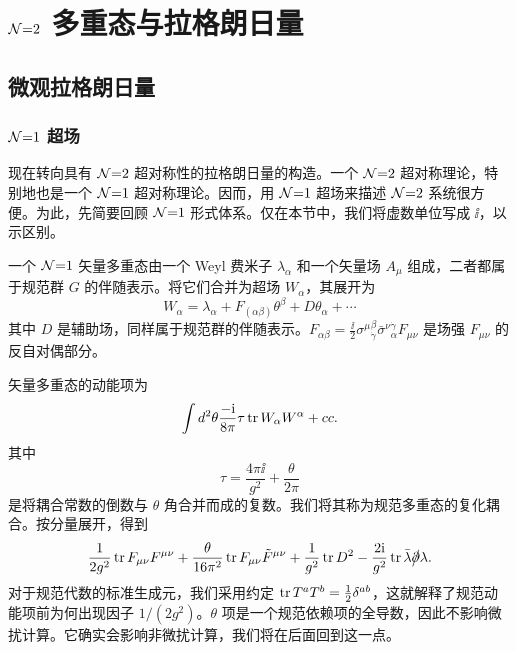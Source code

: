 \section{$\mathcal{N}{=}2$ 多重态与拉格朗日量}\label{sec:lagrangian}

\subsection{微观拉格朗日量}
\subsubsection{$\mathcal{N}{=}1$ 超场}
现在转向具有 $\mathcal{N}{=}2$ 超对称性的拉格朗日量的构造。一个 $\mathcal{N}{=}2$ 超对称理论，特别地也是一个 $\mathcal{N}{=}1$ 超对称理论。因而，用 $\mathcal{N}{=}1$ 超场来描述 $\mathcal{N}{=}2$ 系统很方便。为此，先简要回顾 $\mathcal{N}{=}1$ 形式体系。仅在本节中，我们将虚数单位写成 $\ii$，以示区别。

一个 $\mathcal{N}{=}1$ 矢量多重态由一个 Weyl 费米子 $\lambda_\alpha$ 和一个矢量场 $A_\mu$ 组成，二者都属于规范群 $G$ 的伴随表示。将它们合并为超场 $W_\alpha$，其展开为
\begin{equation}
W_\alpha=\lambda_\alpha+F_{(\alpha\beta)}\theta^\beta + D\theta_\alpha+\cdots
\end{equation}
其中 $D$ 是辅助场，同样属于规范群的伴随表示。$F_{\alpha\beta}=\frac \ii2 \sigma^\mu{}^\beta_{\dot\gamma} \bar\sigma^{\nu}{}^{\dot \gamma}_\alpha F_{\mu\nu}$ 是场强 $F_{\mu\nu}$ 的反自对偶部分。

矢量多重态的动能项为
\begin{equation}
\int d^2\theta \frac{-\mathrm{i}}{8\pi} \tau \mathop{\mathrm{tr}}\nolimits W_\alpha W^\alpha + cc.
\end{equation}
其中
\begin{equation}
\tau=\frac{4\pi \ii}{g^2}+\frac{\theta}{2\pi}
\end{equation}
是将耦合常数的倒数与 $\theta$ 角合并而成的复数。我们将其称为规范多重态的复化耦合。按分量展开，得到
\begin{equation}
\frac{1}{2g^2} \tr F_{\mu\nu}F^{\mu\nu} + \frac{\theta}{16\pi^2} \tr F_{\mu\nu} \tilde F^{\mu\nu} + \frac{1}{g^2}\tr D^2 -\frac{2\ii}{g^2}\tr \bar\lambda\slash\partial \lambda.
\end{equation}
对于规范代数的标准生成元，我们采用约定 $\mathop{\mathrm{tr}}\nolimits T^a T^b = \frac12 \delta^{ab}$，这就解释了规范动能项前为何出现因子 $1/(2g^2)$。$\theta$ 项是一个规范依赖项的全导数，因此不影响微扰计算。它确实会影响非微扰计算，我们将在后面回到这一点。

